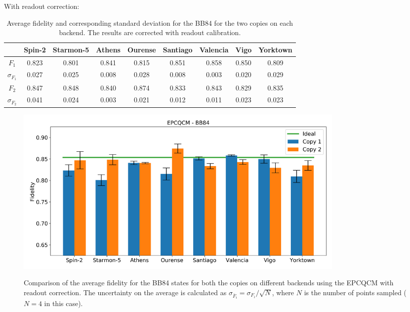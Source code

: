 With readout correction:
\begin{table}[H]
    \centering
    \begin{tabular}{|c|c|c|c|c|c|c|c|c|}
    \hline
    \textbf{} & \textbf{Spin-2} & \textbf{Starmon-5} & \textbf{Athens} & \textbf{Ourense} & \textbf{Santiago} & \textbf{Valencia} & \textbf{Vigo} & \textbf{Yorktown} \\ \hline
    $F_1$              & 0.823 & 0.801 & 0.841 & 0.815 & 0.851 & 0.858 & 0.850 & 0.809 \\ \hline
    $\sigma_{F_1}$     & 0.027 & 0.025 & 0.008 & 0.028 & 0.008 & 0.003 & 0.020 & 0.029 \\ \hline
    $F_2$              & 0.847 & 0.848 & 0.840 & 0.874 & 0.833 & 0.843 & 0.829 & 0.835 \\ \hline
    $\sigma_{F_2}$     & 0.041 & 0.024 & 0.003 & 0.021 & 0.012 & 0.011 & 0.023 & 0.023 \\ \hline
    \end{tabular}
    \caption{Average fidelity and corresponding standard deviation for the BB84 for the two copies on each backend. The results are corrected with readout calibration.}
\end{table}

\begin{figure}[H]
  \centering
          \includegraphics[width=0.8\textwidth]{Figures/Economical/Histograms/histo_bb84_corrected.png}
      \label{fig:epc_histo_bb84_corrected}
      \caption{Comparison of the average fidelity for the BB84 states for both the copies on different backends using the EPCQCM with readout correction. The uncertainty on the average is calculated as $\sigma_{\overline{F}_i}=\sigma_{F_i}/\sqrt{N}$, where $N$ is the number of points sampled ($N=4$ in this case).}
\end{figure}

